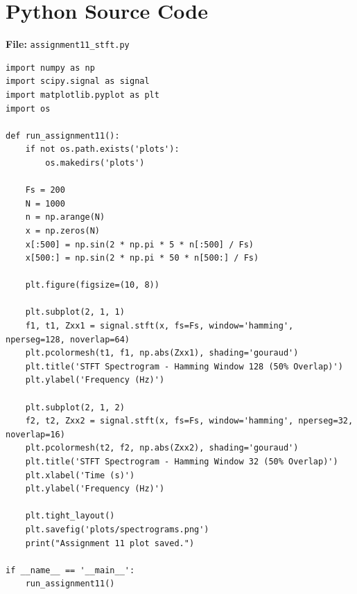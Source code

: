 \documentclass[11pt, a4paper]{article}
\begin{document}
\appendix
\section{Python Source Code}
\textbf{File:} \texttt{assignment11\_stft.py}
\begin{lstlisting}[caption={STFT Spectrogram -- Assignment 11}]
import numpy as np
import scipy.signal as signal
import matplotlib.pyplot as plt
import os

def run_assignment11():
    if not os.path.exists('plots'):
        os.makedirs('plots')

    Fs = 200
    N = 1000
    n = np.arange(N)
    x = np.zeros(N)
    x[:500] = np.sin(2 * np.pi * 5 * n[:500] / Fs)
    x[500:] = np.sin(2 * np.pi * 50 * n[500:] / Fs)

    plt.figure(figsize=(10, 8))

    plt.subplot(2, 1, 1)
    f1, t1, Zxx1 = signal.stft(x, fs=Fs, window='hamming', nperseg=128, noverlap=64)
    plt.pcolormesh(t1, f1, np.abs(Zxx1), shading='gouraud')
    plt.title('STFT Spectrogram - Hamming Window 128 (50% Overlap)')
    plt.ylabel('Frequency (Hz)')

    plt.subplot(2, 1, 2)
    f2, t2, Zxx2 = signal.stft(x, fs=Fs, window='hamming', nperseg=32, noverlap=16)
    plt.pcolormesh(t2, f2, np.abs(Zxx2), shading='gouraud')
    plt.title('STFT Spectrogram - Hamming Window 32 (50% Overlap)')
    plt.xlabel('Time (s)')
    plt.ylabel('Frequency (Hz)')

    plt.tight_layout()
    plt.savefig('plots/spectrograms.png')
    print("Assignment 11 plot saved.")

if __name__ == '__main__':
    run_assignment11()
\end{lstlisting}
\end{document}
